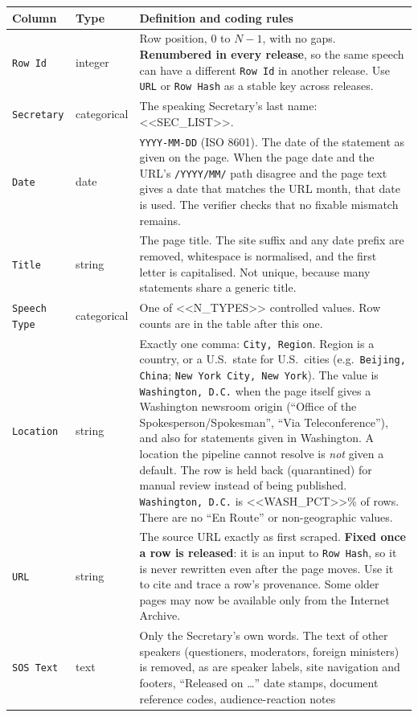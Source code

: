 \documentclass[10pt]{article}
\newcommand{\col}[1]{\texttt{#1}}
\begin{document}
\begin{longtable}{@{}L{1.25in}L{0.75in}L{4.35in}@{}}
\toprule
Column & Type & Definition and coding rules \\
\midrule
\endhead
\col{Row Id} & integer & Row position, 0 to $N-1$, with no gaps. \textbf{Renumbered in every
release}, so the same speech can have a different \col{Row Id} in another release.
Use \col{URL} or \col{Row Hash} as a stable key across releases. \\
\col{Secretary} & categorical & The speaking Secretary's last name: <<SEC_LIST>>. \\
\col{Date} & date & \texttt{YYYY-MM-DD} (ISO 8601). The date of the statement as given on the page.
When the page date and the URL's \texttt{/YYYY/MM/} path disagree and the page text gives a
date that matches the URL month, that date is used. The verifier checks that no fixable
mismatch remains. \\
\col{Title} & string & The page title. The site suffix and any date prefix are removed,
whitespace is normalised, and the first letter is capitalised. Not unique, because many
statements share a generic title. \\
\col{Speech Type} & categorical & One of <<N_TYPES>> controlled values. Row counts are in the table
after this one. \\
\col{Location} & string & Exactly one comma: \texttt{City, Region}. Region is a country, or a
U.S.\ state for U.S.\ cities (e.g.\ \texttt{Beijing, China}; \texttt{New York City, New York}).
The value is \texttt{Washington, D.C.} when the page itself gives a Washington newsroom origin
(``Office of the Spokesperson/Spokesman'', ``Via Teleconference''), and also for
statements given in Washington. A location the pipeline cannot resolve is \emph{not} given
a default. The row is held back (quarantined) for manual review instead of being published.
\texttt{Washington, D.C.} is <<WASH_PCT>>\% of rows. There are no ``En Route'' or non-geographic values. \\
\col{URL} & string & The source URL exactly as first scraped. \textbf{Fixed once a row
is released}: it is an input to \col{Row Hash}, so it is never rewritten even after the page
moves. Use it to cite and trace a row's provenance. Some older pages may now be
available only from the Internet Archive. \\
\col{SOS Text} & text & Only the Secretary's own words. The text of other speakers
(questioners, moderators, foreign ministers) is removed, as are speaker labels, site navigation and
footers, ``Released on \ldots'' date stamps, document reference codes, audience-reaction notes

\end{longtable}
\end{document}

